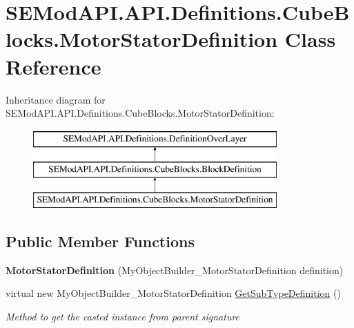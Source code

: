 \hypertarget{class_s_e_mod_a_p_i_1_1_a_p_i_1_1_definitions_1_1_cube_blocks_1_1_motor_stator_definition}{}\section{S\+E\+Mod\+A\+P\+I.\+A\+P\+I.\+Definitions.\+Cube\+Blocks.\+Motor\+Stator\+Definition Class Reference}
\label{class_s_e_mod_a_p_i_1_1_a_p_i_1_1_definitions_1_1_cube_blocks_1_1_motor_stator_definition}
Inheritance diagram for S\+E\+Mod\+A\+P\+I.\+A\+P\+I.\+Definitions.\+Cube\+Blocks.\+Motor\+Stator\+Definition\+:\begin{figure}[H]
\begin{center}
\leavevmode
\includegraphics[height=3.000000cm]{class_s_e_mod_a_p_i_1_1_a_p_i_1_1_definitions_1_1_cube_blocks_1_1_motor_stator_definition}
\end{center}
\end{figure}
\subsection*{Public Member Functions}
\begin{DoxyCompactItemize}
\item 
\hypertarget{class_s_e_mod_a_p_i_1_1_a_p_i_1_1_definitions_1_1_cube_blocks_1_1_motor_stator_definition_ad2292b3207bf555b3373c41c4aeed7e0}{}{\bfseries Motor\+Stator\+Definition} (My\+Object\+Builder\+\_\+\+Motor\+Stator\+Definition definition)\label{class_s_e_mod_a_p_i_1_1_a_p_i_1_1_definitions_1_1_cube_blocks_1_1_motor_stator_definition_ad2292b3207bf555b3373c41c4aeed7e0}

\item 
virtual new My\+Object\+Builder\+\_\+\+Motor\+Stator\+Definition \hyperlink{class_s_e_mod_a_p_i_1_1_a_p_i_1_1_definitions_1_1_cube_blocks_1_1_motor_stator_definition_a5fbf2dd343c24f588360b91b51744c06}{Get\+Sub\+Type\+Definition} ()
\begin{DoxyCompactList}\small\item\em Method to get the casted instance from parent signature \end{DoxyCompactList}\end{DoxyCompactItemize}
